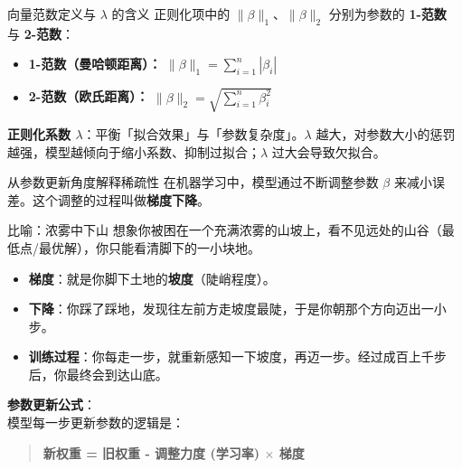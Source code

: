 \documentclass[aspectratio=169]{beamer}
\begin{document}
\begin{frame}{向量范数定义与 $\lambda$ 的含义}
    正则化项中的 $\|\beta\|_1$、$\|\beta\|_2$ 分别为参数的 \textbf{1-范数} 与 \textbf{2-范数}：
    \begin{itemize}
        \item \textbf{1-范数（曼哈顿距离）：} $\|\beta\|_1 = \sum_{i=1}^{n}|\beta_i|$
        \item \textbf{2-范数（欧氏距离）：} $\|\beta\|_2 = \sqrt{\sum_{i=1}^{n}\beta_i^2}$
    \end{itemize}
    \vspace{0.4cm}
    \textbf{正则化系数 $\lambda$}：平衡「拟合效果」与「参数复杂度」。$\lambda$ 越大，对参数大小的惩罚越强，模型越倾向于缩小系数、抑制过拟合；$\lambda$ 过大会导致欠拟合。
\end{frame}

\begin{frame}{从参数更新角度解释稀疏性}
    在机器学习中，模型通过不断调整参数 $\beta$ 来减小误差。这个调整的过程叫做\textbf{梯度下降}。
    
    \begin{block}{比喻：浓雾中下山}
        想象你被困在一个充满浓雾的山坡上，看不见远处的山谷（最低点/最优解），你只能看清脚下的一小块地。
        \begin{itemize}
            \item \textbf{梯度}：就是你脚下土地的\textbf{坡度}（陡峭程度）。
            \item \textbf{下降}：你踩了踩地，发现往左前方走坡度最陡，于是你朝那个方向迈出一小步。
            \item \textbf{训练过程}：你每走一步，就重新感知一下坡度，再迈一步。经过成百上千步后，你最终会到达山底。
        \end{itemize}
    \end{block}

    \textbf{参数更新公式}：\\
    模型每一步更新参数的逻辑是：
    \begin{quote}
        \textbf{新权重 = 旧权重 - 调整力度 (学习率) $\times$ 梯度}
    \end{quote}
\end{frame}
\end{document}
